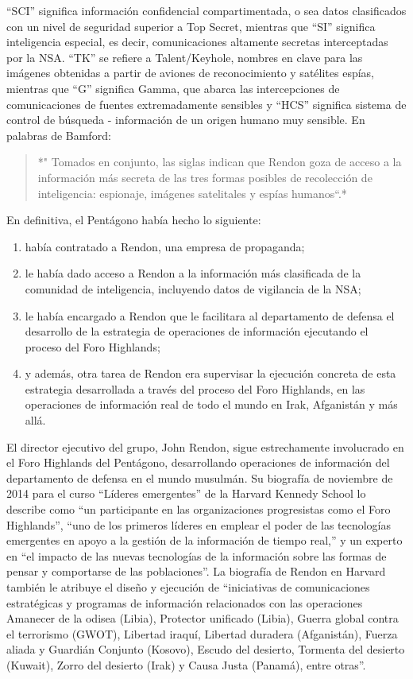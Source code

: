 \documentclass[10pt,a5paper,twoside,spanish,]{book}
\begin{document}
``SCI'' significa información confidencial compartimentada, o sea datos
clasificados con un nivel de seguridad superior a Top Secret, mientras
que ``SI'' significa inteligencia especial, es decir, comunicaciones
altamente secretas interceptadas por la NSA. ``TK'' se refiere a
Talent/Keyhole, nombres en clave para las imágenes obtenidas a partir de
aviones de reconocimiento y satélites espías, mientras que ``G''
significa Gamma, que abarca las intercepciones de comunicaciones de
fuentes extremadamente sensibles y ``HCS'' significa sistema de control
de búsqueda - información de un origen humano muy sensible. En palabras
de Bamford:

\begin{quote}
*" Tomados en conjunto, las siglas indican que Rendon goza de acceso a
la información más secreta de las tres formas posibles de recolección de
inteligencia: espionaje, imágenes satelitales y espías humanos``.*
\end{quote}

En definitiva, el Pentágono había hecho lo siguiente:

\begin{enumerate}
\def\labelenumi{\arabic{enumi}.}
\item
  había contratado a Rendon, una empresa de propaganda;
\item
  le había dado acceso a Rendon a la información más clasificada de la
  comunidad de inteligencia, incluyendo datos de vigilancia de la NSA;
\item
  le había encargado a Rendon que le facilitara al departamento de
  defensa el desarrollo de la estrategia de operaciones de información
  ejecutando el proceso del Foro Highlands;
\item
  y además, otra tarea de Rendon era supervisar la ejecución concreta de
  esta estrategia desarrollada a través del proceso del Foro Highlands,
  en las operaciones de información real de todo el mundo en Irak,
  Afganistán y más allá.
\end{enumerate}

El director ejecutivo del grupo, John Rendon, sigue estrechamente
involucrado en el Foro Highlands del Pentágono, desarrollando
operaciones de información del departamento de defensa en el mundo
musulmán. Su biografía de noviembre de 2014 para el curso ``Líderes
emergentes'' de la Harvard Kennedy School lo describe como ``un
participante en las organizaciones progresistas como el Foro
Highlands'', ``uno de los primeros líderes en emplear el poder de las
tecnologías emergentes en apoyo a la gestión de la información de tiempo
real,'' y un experto en ``el impacto de las nuevas tecnologías de la
información sobre las formas de pensar y comportarse de las
poblaciones''. La biografía de Rendon en Harvard también le atribuye el
diseño y ejecución de ``iniciativas de comunicaciones estratégicas y
programas de información relacionados con las operaciones Amanecer de la
odisea (Libia), Protector unificado (Libia), Guerra global contra el
terrorismo (GWOT), Libertad iraquí, Libertad duradera (Afganistán),
Fuerza aliada y Guardián Conjunto (Kosovo), Escudo del desierto,
Tormenta del desierto (Kuwait), Zorro del desierto (Irak) y Causa Justa
(Panamá), entre otras''.
\end{document}
